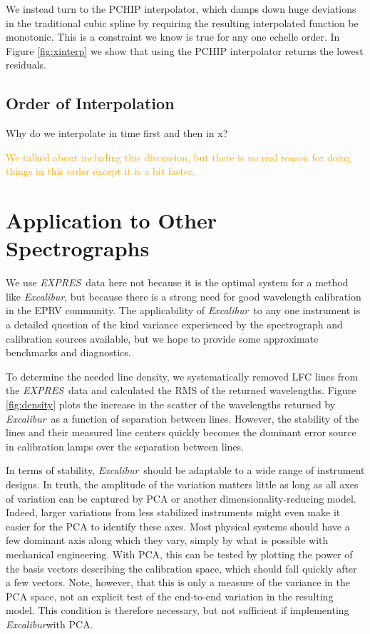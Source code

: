 \documentclass[modern]{aastex63}
\newcommand{\project}[1]{\textsl{#1}}
\newcommand{\name}{\project{Excalibur}}
\newcommand{\acronym}[1]{{\small{#1}}}
\newcommand{\expres}{\project{\acronym{EXPRES}}}
\newcommand{\lz}[1]{\textcolor{orange}{#1}}
\begin{document}
We instead turn to the PCHIP interpolator, which damps down huge deviations in the traditional cubic spline by requiring the resulting interpolated function be monotonic.  This is a constraint we know is true for any one echelle order.  In Figure \ref{fig:xinterp} we show that using the PCHIP interpolator returns the lowest residuals.

\subsection{Order of Interpolation}
Why do we interpolate in time first and then in x?

\lz{We talked about including this discussion, but there is no real reason for doing things in this order except it is a bit faster.}


\section{Application to Other Spectrographs}
We use \expres\ data here not because it is the optimal system for a method like \name, but because there is a strong need for good wavelength calibration in the EPRV community.  The applicability of \name\ to any one instrument is a detailed question of the kind variance experienced by the spectrograph and calibration sources available, but we hope to provide some approximate benchmarks and diagnostics.

To determine the needed line density, we systematically removed LFC lines from the \expres\ data and calculated the RMS of the returned wavelengths.  Figure \ref{fig:density} plots the increase in the scatter of the wavelengths returned by \name\ as a function of separation between lines.  However, the stability of the lines and their measured line centers quickly becomes the dominant error source in calibration lamps over the separation between lines.

In terms of stability, \name\ should be adaptable to a wide range of instrument designs.  In truth, the amplitude of the variation matters little as long as all axes of variation can be captured by PCA or another dimensionality-reducing model.  Indeed, larger variations from less stabilized instruments might even make it easier for the PCA to identify these axes.  Most physical systems should have a few dominant axis along which they vary, simply by what is possible with mechanical engineering.  With PCA, this can be tested by plotting the power of the basis vectors describing the calibration space, which should fall quickly after a few vectors.  Note, however, that this is only a measure of the variance in the PCA space, not an explicit test of the end-to-end variation in the resulting model.  This condition is therefore necessary, but not sufficient if implementing \name with PCA.
\end{document}
